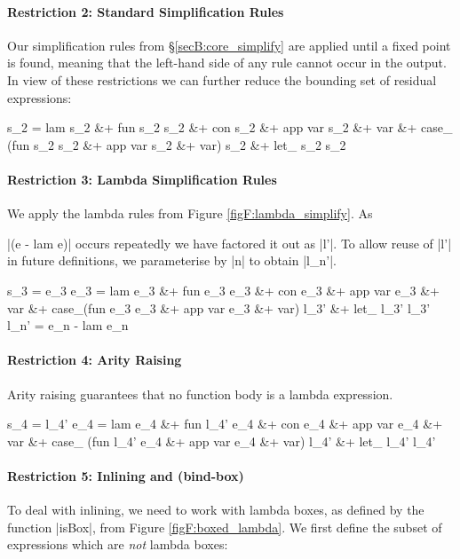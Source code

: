 \paragraph{Restriction 2: Standard Simplification Rules}
Our simplification rules from \S\ref{secB:core_simplify} are applied until a fixed point is found, meaning that the left-hand side of any rule cannot occur in the output. In view of these restrictions we can further reduce the bounding set of residual expressions:

\ignore\begin{code}
s_2  =  lam s_2 &+ fun s_2 s_2 &+ con s_2 &+ app var s_2 &+ var &+
        case_ (fun s_2 s_2 &+ app var s_2 &+ var) s_2 &+ let_ s_2 s_2
\end{code}

\paragraph{Restriction 3: Lambda Simplification Rules}
We apply the lambda rules from Figure \ref{figF:lambda_simplify}. As \ignore|(e - lam e)| occurs repeatedly we have factored it out as |l'|. To allow reuse of |l'| in future definitions, we parameterise by |n| to obtain |l_n'|.

\ignore\begin{code}
s_3   =  e_3
e_3   =  lam e_3 &+ fun e_3 e_3 &+ con e_3 &+ app var e_3 &+ var &+
         case_(fun e_3 e_3 &+ app var e_3 &+ var) l_3' &+ let_ l_3' l_3'
l_n'  =  e_n - lam e_n
\end{code}

\paragraph{Restriction 4: Arity Raising}
Arity raising guarantees that no function body is a lambda expression.

\ignore\begin{code}
s_4   =  l_4'
e_4   =  lam e_4 &+ fun l_4' e_4 &+ con e_4 &+ app var e_4 &+ var &+
         case_ (fun l_4' e_4 &+ app var e_4 &+ var) l_4' &+ let_ l_4' l_4'
\end{code}

\paragraph{Restriction 5: Inlining and (bind-box)}
To deal with inlining, we need to work with lambda boxes, as defined by the function |isBox|, from Figure \ref{figF:boxed_lambda}. We first define the subset of expressions which are \textit{not} lambda boxes:

